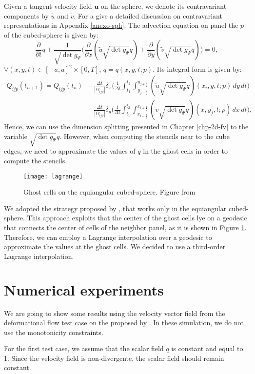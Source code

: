 Given a tangent velocity field $\boldsymbol{u}$ on the sphere, we denote its
contravariant components by $\tilde{u}$ and $\tilde{v}$.
For a give a detailed discussion on contravariant representations in Appendix \ref{anexo-sph}.
The advection equation on panel the $p$ of the cubed-sphere is given by:
\begin{equation*}
	\frac{\partial}{\partial t}{q}+
	\frac{1}{\sqrt{\det{g_{\Psi}}}}\bigg(
	\frac{\partial}{\partial x} {(\tilde{u}\sqrt{\det{g_{\Psi}}}q)}+
	\frac{\partial}{\partial y} {(\tilde{v}\sqrt{\det{g_{\Psi}}}q)}
	\bigg)
	= 0,
\end{equation*}
$\forall (x,y,t) \in [-a,a]^2\times[0,T]$, $q = {q}(x,y,t;p)$.
Its integral form is given by:
\begin{align*}
	{Q}_{ijp}(t_{n+1})  = {Q}_{ijp}(t_{n})
	&- \frac{\Delta t}{|\Omega_{ijp}|}
	\delta _x \bigg( \frac{1}{\Delta t}
	\int_{t_1}^{t_2} \int_{y_{j-\frac{1}{2}}}^{y_{j+\frac{1}{2}}}
	{(\tilde{u}\sqrt{\det{g_{\Psi}}}q)}(x_{i}, y, t;p)
	\,dy \,dt \bigg) \\ \nonumber
	&- \frac{\Delta t}{|\Omega_{ijp}|}
	\delta _y \bigg( \frac{1}{\Delta t}
	\int_{t_1}^{t_2} \int_{x_{i-\frac{1}{2}}}^{x_{i+\frac{1}{2}}}
	{(\tilde{v}\sqrt{\det{g_{\Psi}}}q)}(x, y_{j}, t;p)
	\,dx \,dt \bigg),
\end{align*}
Hence, we can use the dimension splitting presented in Chapter \ref{chp-2d-fv}
to the variable $\sqrt{\det{g_{\Psi}}}q$.
However, when computing the stencils near to the cube edges,
we need to approximate the values of $q$ in the ghost cells in order to compute
the stencils.


\begin{figure}[ht] %
	\centering
	\texttt{[image: lagrange]}
	\caption{Ghost cells on the equiangular cubed-sphere. Figure from \citet{chen:2021}}
	\label{lagrange}
\end{figure}

We adopted the strategy proposed by \citet{chen:2021},
that works only in the equiangular cubed-sphere.
This approach exploits that the center of the ghost cells
lye on a geodesic that connects the center of cells of the neighbor panel,
as it is shown in Figure \ref{lagrange}.
Therefore, we can employ a Lagrange interpolation over a geodesic
to approximate the values at the ghost cells.
We decided to use a third-order Lagrange interpolation.

\section{Numerical experiments}
We are going to show some results using the velocity vector field from
the deformational flow test case on the proposed by \citet{nair:2010}. 
In these simulation, we do not use the monotonicity constraints.

For the first test case, we assume that the scalar field $q$ is constant and equal to 1.
Since the velocity field is non-divergente, the scalar field should remain constant.


